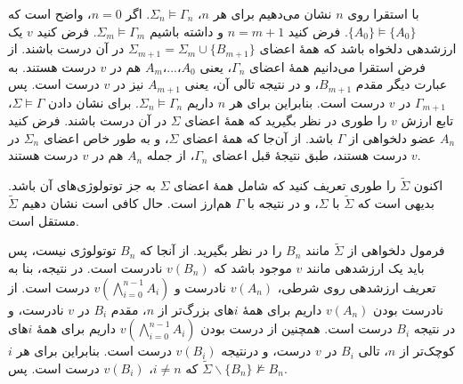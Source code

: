 \begin{ans}
\begin{enumerate}
    با استقرا روی $n$ نشان می‌دهیم برای هر $n$، $\Sigma_n \models \Gamma_n$.
    اگر $n=0$، واضح است که $\{A_0\} \models \{A_0\}$. فرض کنید $n=m+1$ و داشته باشیم $\Sigma_m \models \Gamma_m$. فرض کنید $v$ یک ارزشدهی دلخواه باشد که همهٔ اعضای $\Sigma_{m+1} = \Sigma_m \cup \{ B_{m+1} \}$ در آن درست باشند. از فرض استقرا می‌دانیم همهٔ اعضای $\Gamma_n$، یعنی $A_0$،...،$A_m$ هم در $v$ درست هستند. به عبارت دیگر مقدم $B_{m+1}$، و در نتیجه تالی آن، یعنی $A_{m+1}$ نیز در $v$ درست است. پس $\Gamma_{m+1}$ در $v$ درست است. بنابراین برای هر $n$ داریم $\Sigma_n \models \Gamma_n$. برای نشان دادن $\Sigma \models \Gamma$، تابع ارزش $v$ را طوری در نظر بگیرید که همهٔ اعضای $\Sigma$ در آن درست باشند. فرض کنید $A_n$ عضو دلخواهی از $\Gamma$ باشد. از آن‌جا که همهٔ اعضای $\Sigma$، و به طور خاص اعضای $\Sigma_n$ در $v$ درست هستند، طبق نتیجهٔ قبل اعضای $\Gamma_n$، از جمله $A_n$ هم در $v$ درست هستند.

    اکنون $\tilde{\Sigma}$ را طوری تعریف کنید که شامل همهٔ اعضای $\Sigma$ به جز توتولوژی‌های آن باشد. بدیهی است که $\tilde{\Sigma}$ با $\Sigma$، و در نتیجه با $\Gamma$ هم‌ارز است. حال کافی است نشان دهیم $\tilde{\Sigma}$ مستقل است.

    فرمول دلخواهی از $\tilde{\Sigma}$ مانند $B_n$ را در نظر بگیرید. از آنجا که $B_n$ توتولوژی نیست، پس باید یک ارزشدهی مانند $v$ موجود باشد که $v(B_n)$ نادرست است. در نتیجه، بنا به تعریف ارزشدهی روی شرطی، $v(A_n)$ نادرست و $v(\bigwedge_{i=0}^{n-1} A_i)$ درست است. از نادرست بودن $v(A_n)$ داریم برای همهٔ $i$های بزرگ‌تر از $n$، مقدم $B_i$ در $v$ نادرست، و در نتیجه $B_i$ درست است. همچنین از درست بودن $v(\bigwedge_{i=0}^{n-1} A_i)$ داریم برای همهٔ $i$های کوچک‌تر از $n$، تالی $B_i$ در $v$ درست، و درنتیجه $v(B_i)$ درست است. بنابراین برای هر $i$ که $i \neq n$، $v(B_i)$ درست است. پس $\tilde{\Sigma}\backslash\{B_n\} \not\models B_n$.

  \end{enumerate}
\end{ans}